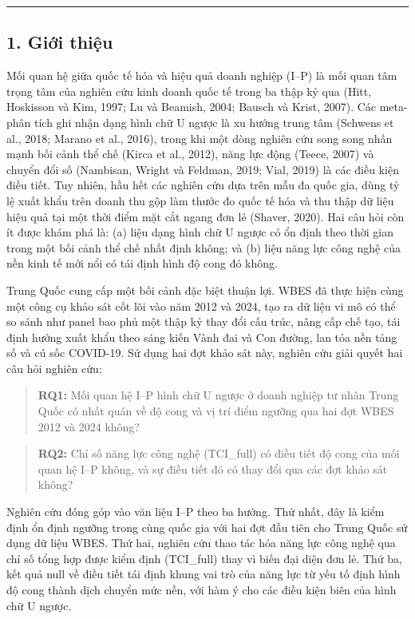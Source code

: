 \documentclass[12pt,a4paper]{article}
\begin{document}
\begin{center}\rule{0.5\linewidth}{0.5pt}\end{center}

\hypertarget{1-giux1edbi-thiux1ec7u}{%
\subsection{1. Giới thiệu}\label{1-giux1edbi-thiux1ec7u}}

Mối quan hệ giữa quốc tế hóa và hiệu quả doanh nghiệp (I--P) là mối quan
tâm trọng tâm của nghiên cứu kinh doanh quốc tế trong ba thập kỷ qua
(Hitt, Hoskisson và Kim, 1997; Lu và Beamish, 2004; Bausch và Krist,
2007). Các meta-phân tích ghi nhận dạng hình chữ U ngược là xu hướng
trung tâm (Schwens et al., 2018; Marano et al., 2016), trong khi một
dòng nghiên cứu song song nhấn mạnh bối cảnh thể chế (Kirca et al.,
2012), năng lực động (Teece, 2007) và chuyển đổi số (Nambisan, Wright và
Feldman, 2019; Vial, 2019) là các điều kiện điều tiết. Tuy nhiên, hầu
hết các nghiên cứu dựa trên mẫu đa quốc gia, dùng tỷ lệ xuất khẩu trên
doanh thu gộp làm thước đo quốc tế hóa và thu thập dữ liệu hiệu quả tại
một thời điểm mặt cắt ngang đơn lẻ (Shaver, 2020). Hai câu hỏi còn ít
được khám phá là: (a) liệu dạng hình chữ U ngược có ổn định theo thời
gian trong một bối cảnh thể chế nhất định không; và (b) liệu năng lực
công nghệ của nền kinh tế mới nổi có tái định hình độ cong đó không.

Trung Quốc cung cấp một bối cảnh đặc biệt thuận lợi. WBES đã thực hiện
cùng một công cụ khảo sát cốt lõi vào năm 2012 và 2024, tạo ra dữ liệu
vi mô có thể so sánh như panel bao phủ một thập kỷ thay đổi cấu trúc,
nâng cấp chế tạo, tái định hướng xuất khẩu theo sáng kiến Vành đai và
Con đường, lan tỏa nền tảng số và cú sốc COVID-19. Sử dụng hai đợt khảo
sát này, nghiên cứu giải quyết hai câu hỏi nghiên cứu:

\begin{quote}
\textbf{RQ1:} Mối quan hệ I--P hình chữ U ngược ở doanh nghiệp tư nhân
Trung Quốc có nhất quán về độ cong và vị trí điểm ngưỡng qua hai đợt
WBES 2012 và 2024 không?
\end{quote}

\begin{quote}
\textbf{RQ2:} Chỉ số năng lực công nghệ (TCI\_full) có điều tiết độ cong
của mối quan hệ I--P không, và sự điều tiết đó có thay đổi qua các đợt
khảo sát không?
\end{quote}

Nghiên cứu đóng góp vào văn liệu I--P theo ba hướng. Thứ nhất, đây là
kiểm định ổn định ngưỡng trong cùng quốc gia với hai đợt đầu tiên cho
Trung Quốc sử dụng dữ liệu WBES. Thứ hai, nghiên cứu thao tác hóa năng
lực công nghệ qua chỉ số tổng hợp được kiểm định (TCI\_full) thay vì
biến đại diện đơn lẻ. Thứ ba, kết quả null về điều tiết tái định khung
vai trò của năng lực từ yếu tố định hình độ cong thành dịch chuyển mức
nền, với hàm ý cho các điều kiện biên của hình chữ U ngược.
\end{document}
